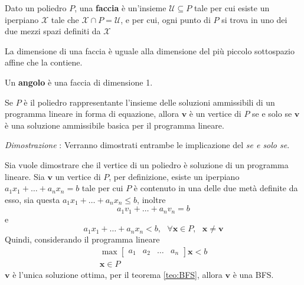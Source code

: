 \documentclass[10pt, letterpaper]{report}
\begin{document}
\begin{definizione}
    Dato un poliedro $P$, una \textbf{faccia} è un'insieme $\mathcal U\subseteq P$ tale per cui esiste un iperpiano $\mathcal X$ tale che $\mathcal X\cap P = \mathcal U$, e per cui, ogni punto di $P$ si trova in uno dei due mezzi spazi definiti da $\mathcal X$
\end{definizione}
La dimensione di una faccia è uguale alla dimensione del più piccolo sottospazio affine che la contiene.
\begin{definizione}
    Un \textbf{angolo} è una faccia di dimensione 1.
\end{definizione}
\begin{teorema}
    Se $P$ è il poliedro rappresentante l'insieme delle soluzioni ammissibili di un programma lineare in forma di equazione, allora $\mathbf v$ è un vertice di $P$ se e solo se $\mathbf v$ è una soluzione ammissibile basica per il programma lineare.
\end{teorema}
\textit{Dimostrazione} : Verranno dimostrati entrambe le implicazione del \textit{se e solo se}.

\boxedMath{$\implies$} Sia vuole dimostrare che il vertice di un poliedro è soluzione di un programma lineare. Sia $\mathbf v$ un vertice di $P$, per definizione, esiste un iperpiano $a_1x_1+\dots+a_nx_n=b$ tale per cui $P$ è contenuto in una delle due metà definite da esso, sia questa $a_1x_1+\dots+a_nx_n\le b$, inoltre 
$$a_1v_1+\dots +a_nv_n=b  
$$
e 
$$ a_1x_1+\dots +a_nx_n<b, \ \ \ \forall \mathbf x\in P, \ \ \ \mathbf x\ne\mathbf v  $$
Quindi, considerando il programma lineare 
\begin{eqnarray}
     \max \begin{bmatrix}
        a_1&a_2&\dots&a_n
    \end{bmatrix}\mathbf x < b \\ \mathbf x \in P
\end{eqnarray}
$\mathbf v$ è l'unica soluzione ottima, per il teorema \ref{teo:BFS}, allora $\mathbf v$ è una BFS.
\end{document}
